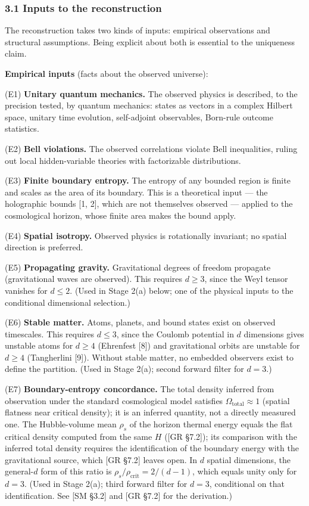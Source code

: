 \documentclass[
]{article}
\begin{document}
\hypertarget{inputs-to-the-reconstruction}{%
\subsubsection{3.1 Inputs to the
reconstruction}\label{inputs-to-the-reconstruction}}

The reconstruction takes two kinds of inputs: empirical observations and
structural assumptions. Being explicit about both is essential to the
uniqueness claim.

\textbf{Empirical inputs} (facts about the observed universe):

(E1) \textbf{Unitary quantum mechanics.} The observed physics is
described, to the precision tested, by quantum mechanics: states as
vectors in a complex Hilbert space, unitary time evolution, self-adjoint
observables, Born-rule outcome statistics.

(E2) \textbf{Bell violations.} The observed correlations violate Bell
inequalities, ruling out local hidden-variable theories with
factorizable distributions.

(E3) \textbf{Finite boundary entropy.} The entropy of any bounded region
is finite and scales as the area of its boundary. This is a theoretical
input --- the holographic bounds {[}1, 2{]}, which are not themselves
observed --- applied to the cosmological horizon, whose finite area
makes the bound apply.

(E4) \textbf{Spatial isotropy.} Observed physics is rotationally
invariant; no spatial direction is preferred.

(E5) \textbf{Propagating gravity.} Gravitational degrees of freedom
propagate (gravitational waves are observed). This requires
\(d \geq 3\), since the Weyl tensor vanishes for \(d \leq 2\). (Used in
Stage 2(a) below; one of the physical inputs to the conditional
dimensional selection.)

(E6) \textbf{Stable matter.} Atoms, planets, and bound states exist on
observed timescales. This requires \(d \leq 3\), since the Coulomb
potential in \(d\) dimensions gives unstable atoms for \(d \geq 4\)
(Ehrenfest {[}8{]}) and gravitational orbits are unstable for
\(d \geq 4\) (Tangherlini {[}9{]}). Without stable matter, no embedded
observers exist to define the partition. (Used in Stage 2(a); second
forward filter for \(d = 3\).)

(E7) \textbf{Boundary-entropy concordance.} The total density inferred
from observation under the standard cosmological model satisfies
\(\Omega_{\text{total}} \approx 1\) (spatial flatness near critical
density); it is an inferred quantity, not a directly measured one. The
Hubble-volume mean \(\rho_s\) of the horizon thermal energy equals the
flat critical density computed from the same \(H\) ({[}GR §7.2{]}); its
comparison with the inferred total density requires the identification
of the boundary energy with the gravitational source, which {[}GR
§7.2{]} leaves open. In \(d\) spatial dimensions, the general-\(d\) form
of this ratio is \(\rho_s / \rho_{\text{crit}} = 2/(d-1)\), which equals
unity only for \(d = 3\). (Used in Stage 2(a); third forward filter for
\(d = 3\), conditional on that identification. See {[}SM §3.2{]} and
{[}GR §7.2{]} for the derivation.)
\end{document}
